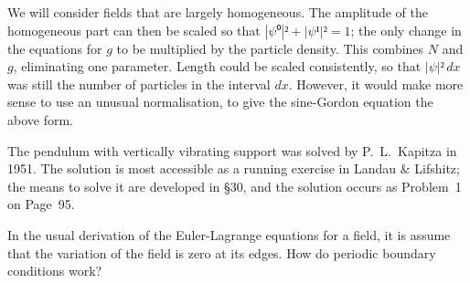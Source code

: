 We will consider fields that are largely homogeneous.  The amplitude of the homogeneous part can then be scaled so that $|ψ⁰|²+|ψ¹|²=1$; the only change in the equations for $g$ to be multiplied by the particle density.  This combines $N$ and $g$, eliminating one parameter.  Length could be scaled consistently, so that $|ψ|²\,dx$ was still the number of particles in the interval $dx$.  However, it would make more sense to use an unusual normalisation, to give the sine-Gordon equation the above form.


The pendulum with vertically vibrating support was solved by P.~L.~Kapitza in 1951.  The solution is most accessible as a running exercise in Landau \& Lifshitz; the means to solve it are developed in \S 30, and the solution occurs as Problem~1 on Page~95.


In the usual derivation of the Euler-Lagrange equations for a field, it is assume that the variation of the field is zero at its edges.  How do periodic boundary conditions work?

\bye